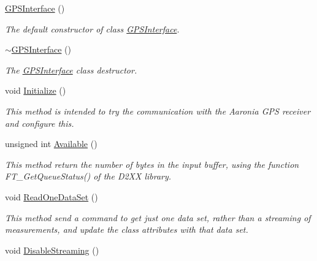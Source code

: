 \begin{DoxyCompactItemize}
\item 
\hyperlink{classGPSInterface_a91c9f19d6588bcd34a8038bdc036c20c}{G\+P\+S\+Interface} ()
\begin{DoxyCompactList}\small\item\em The default constructor of class \hyperlink{classGPSInterface}{G\+P\+S\+Interface}. \end{DoxyCompactList}\item 
\hyperlink{classGPSInterface_ac8156be0348867ab39ba6e7909e16c3b}{$\sim$\+G\+P\+S\+Interface} ()
\begin{DoxyCompactList}\small\item\em The \hyperlink{classGPSInterface}{G\+P\+S\+Interface} class\textquotesingle{} destructor. \end{DoxyCompactList}\item 
void \hyperlink{classGPSInterface_ac4a2712c98235f5ca2d826525180840b}{Initialize} ()
\begin{DoxyCompactList}\small\item\em This method is intended to try the communication with the Aaronia G\+PS receiver and configure this. \end{DoxyCompactList}\item 
\mbox{\label{classGPSInterface_a3f92ed959a1ea60258e48ca7c379aec1}} 
unsigned int \hyperlink{classGPSInterface_a3f92ed959a1ea60258e48ca7c379aec1}{Available} ()
\begin{DoxyCompactList}\small\item\em This method return the number of bytes in the input buffer, using the function F\+T\+\_\+\+Get\+Queue\+Status() of the D2\+XX library. \end{DoxyCompactList}\item 
\mbox{\label{classGPSInterface_acfbd1398a99916c1009b0ac00098ca67}} 
void \hyperlink{classGPSInterface_acfbd1398a99916c1009b0ac00098ca67}{Read\+One\+Data\+Set} ()
\begin{DoxyCompactList}\small\item\em This method send a command to get just one data set, rather than a streaming of measurements, and update the class attributes with that data set. \end{DoxyCompactList}\item 
void \hyperlink{classGPSInterface_a663c36374cc097040cb8945a3c25b190}{Disable\+Streaming} ()

\end{DoxyCompactItemize}
